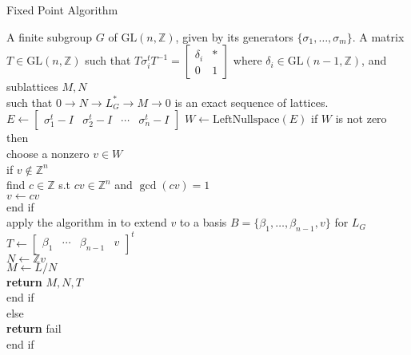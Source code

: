 \documentclass[a4paper, 14pt]{extarticle}
\theoremstyle{plain}
\theoremstyle{definition}
\newcommand{\Z}{\ensuremath{\mathbb{Z}}}
\begin{document}
\begin{algorithm}[H]
	\caption{Fixed Point Algorithm}
	\label{alg:Fixed Point}
	\begin{algorithmic}[1]
		\REQUIRE A finite subgroup $G$ of $\mathrm{GL}(n,\Z)$, given by its generators $\lbrace \sigma_1, \ldots , \sigma_m \rbrace$.
		\ENSURE A matrix $T \in \mathrm{GL}(n,\Z)$ such that $T \sigma^t_i T^{-1}= \left[ \begin{array}{c|c}
		\delta_i & \ast \\
		\hline 
		0 &1
		\end{array} \right]
		$ where $\delta_i \in \mathrm{GL}(n-1,\Z)$, and sublattices $M, N$ \\
		\hspace{0.8cm}such that $0\longrightarrow N \longrightarrow L^*_G \longrightarrow M \longrightarrow 0$ 
		is an exact sequence of lattices.
		\bigskip
		\STATE $E \gets \left[ \begin{array}{c|c|c|c}
		\sigma^t_1-I & \sigma^t_2 -I & \cdots & \sigma^t_n -I
		\end{array} \right]$
	    \STATE $W \gets \mathrm{LeftNullspace}(E)$
	    \STATE if $W $ is not zero then\\
	    \hspace{0.5in} choose a nonzero $v \in W$\\
	    \hspace{0.5 in} if $v \notin \Z^n$ \\
	    \hspace{1in} find $c \in \Z$ s.t $cv \in \Z^n$ and $\gcd(cv) = 1$\\
	    \hspace{1in} $v \gets cv$\\
	    \hspace{0.5 in} end if\\
	    \hspace{0.5in} apply the algorithm in \cite{LatticeBase} to extend $v$ to a basis $B = \lbrace \beta_1, \ldots, \beta_{n-1},v\rbrace$ for $L_G$\\
	    \hspace{0.5in} $T \gets \begin{bmatrix}
	    \beta_1 &  \cdots &  \beta_{n-1}& v
	    \end{bmatrix}^t$\\
		\hspace{0.5in} $N \gets \Z v$\\
		\hspace{0.5in} $M \gets L/N$\\
		\hspace{0.5in} \textbf{return} $M,N, T$\\
	  \hspace{0.5in} end if\\
	  else\\
	     \hspace{0.5in}  \textbf{return} fail\\
	     end if
	 	\end{algorithmic}
\end{algorithm}
\end{document}
